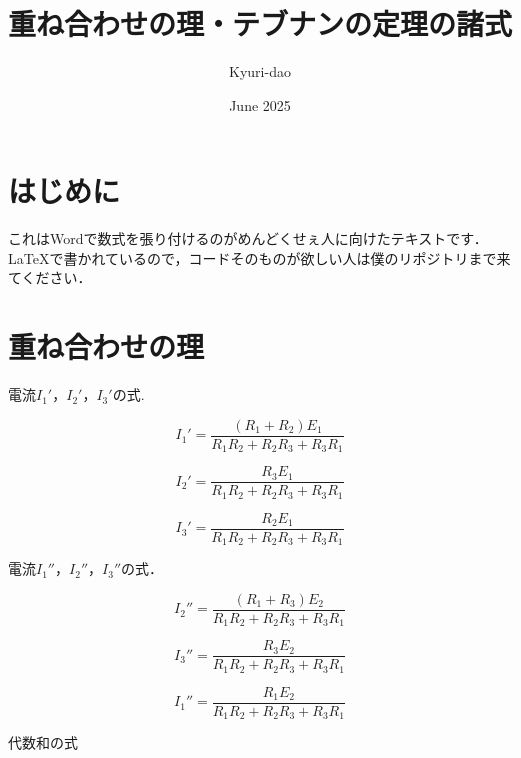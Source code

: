 \documentclass{article}
\title{重ね合わせの理・テブナンの定理の諸式}
\author{Kyuri-dao}
\date{June 2025}
\begin{document}
\maketitle

\section{はじめに}
これはWordで数式を張り付けるのがめんどくせぇ人に向けたテキストです．\\
LaTeXで書かれているので，コードそのものが欲しい人は僕のリポジトリまで来てください．

\section{重ね合わせの理}

\begin{center}
    電流$I_1'$，$I_2'$，$I_3'$の式.
\end{center}



\begin{equation}
    I_1' = \frac{(R_1 + R_2)E_1}{R_1R_2+R_2R_3+R_3R_1}
\end{equation}

\begin{equation}
    I_2' = \frac{R_3E_1}{R_1R_2+R_2R_3+R_3R_1}
\end{equation}

\begin{equation}
    I_3' = \frac{R_2E_1}{R_1R_2+R_2R_3+R_3R_1}
\end{equation}

\begin{center}
    電流$I_1''$，$I_2''$，$I_3''$の式．    
\end{center}


\begin{equation}
    I_2'' = \frac{(R_1+R_3)E_2}{R_1R_2+R_2R_3+R_3R_1}    
\end{equation}

\begin{equation}
    I_3'' = \frac{R_3E_2}{R_1R_2+R_2R_3+R_3R_1}
\end{equation}

\begin{equation}
    I_1'' = \frac{R_1E_2}{R_1R_2+R_2R_3+R_3R_1}
\end{equation}

\begin{center}
    代数和の式
\end{center}
\end{document}
